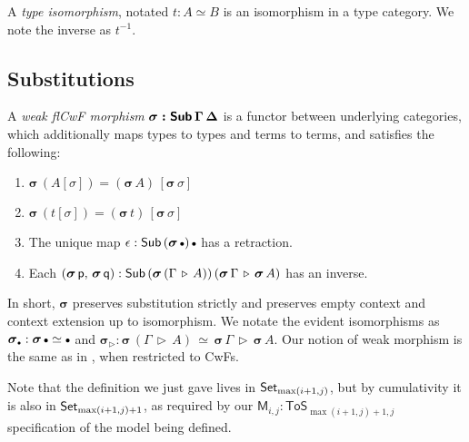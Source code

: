 \documentclass[sigplan,review,anonymous]{acmart}\settopmatter{printfolios=true,printccs=false,printacmref=false}
\newcommand{\ToS}{\mathsf{ToS}}
\newcommand{\ext}{\triangleright}
\newcommand{\emptycon}{\scaleobj{.75}\bullet}
\newcommand{\p}{\mathsf{p}}
\newcommand{\q}{\mathsf{q}}
\newcommand{\bsigma}{\boldsymbol{\sigma}}
\newcommand{\bM}{\boldsymbol{\mathsf{M}}}
\begin{document}
\begin{definition} A \emph{type isomorphism}, notated $t : A \simeq B$ is an isomorphism in a type category. We note the inverse as $t^{-1}$.
\end{definition}

\subsection{Substitutions}
\label{sec:substitutions}

A \emph{weak flCwF morphism} $\boldsymbol{\sigma : \mathsf{Sub}\,\Gamma\,\Delta}$ is a functor between underlying categories, which additionally maps types to types and terms to terms, and satisfies the following:
  \begin{enumerate}
    \item $\bsigma\,(A[\sigma]) = (\bsigma\,A)\,[\bsigma\,\sigma]$
    \item $\bsigma\,(t[\sigma]) = (\bsigma\,t)\,[\bsigma\,\sigma]$
    \item The unique map $\epsilon : \Sub\,(\bsigma\,\emptycon)\,\emptycon$ has a retraction.
    \item Each $(\bsigma\,\p,\,\bsigma\,\q) : \Sub\,(\bsigma\,(\Gamma\,\ext\,A))\,(\bsigma\,\Gamma\,\ext\,\bsigma\,A)$ has an inverse.
  \end{enumerate}


In short, $\bsigma$ preserves substitution strictly and preserves
empty context and context extension up to isomorphism. We notate the evident
isomorphisms as $\bsigma_{\emptycon} :
\bsigma\,\emptycon \simeq \emptycon$ and $\bsigma_{\ext}
:
\bsigma\,(\Gamma\,\ext\,A)\,\simeq\,\bsigma\,\Gamma\,\ext\,\bsigma\,A$. Our notion of weak morphism is the same as in \cite{birkedal2018modal}, when restricted to CwFs.

Note that the definition we just gave lives in $\mathsf{Set}_{\max(i+1,j)}$, but by
cumulativity it is also in $\mathsf{Set}_{\max(i+1,j)+1}$, as required by our $\bM_{i,j}
: \ToS_{\max(i+1,j)+1, j}$ specification of the model being defined.
\end{document}

